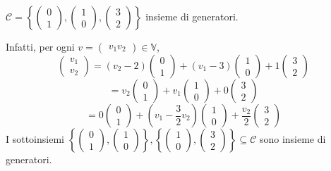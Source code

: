 \documentclass[12pt]{article}
\begin{document}
\begin{center}
$\mathcal{C} = \left\{\begin{pmatrix}
    0\\
    1
\end{pmatrix}, \begin{pmatrix}
    1\\
    0
\end{pmatrix}, \begin{pmatrix}
    3\\
    2
\end{pmatrix}\right\}$ insieme di generatori.
\end{center}
Infatti, per ogni $v = \begin{pmatrix}
    v_1
    v_2
\end{pmatrix} \in \mathbb{V}$,
\[\begin{pmatrix}
    v_1\\
    v_2
\end{pmatrix} = (v_2 - 2)\begin{pmatrix}
    0\\
    1
\end{pmatrix} + (v_1 - 3)\begin{pmatrix}
    1\\
    0
\end{pmatrix} + 1\begin{pmatrix}
    3\\
    2
\end{pmatrix}\]
\[= v_2\begin{pmatrix}
    0\\
    1
\end{pmatrix} + v_1\begin{pmatrix}
    1\\
    0
\end{pmatrix} + 0\begin{pmatrix}
    3\\
    2
\end{pmatrix}\]
\[= 0 \begin{pmatrix}
    0\\
    1
\end{pmatrix} + \left(v_1 - \frac{3}{2}v_2\right)\begin{pmatrix}
    1\\
    0
\end{pmatrix}+ \frac{v_2}{2}\begin{pmatrix}
    3\\
    2
\end{pmatrix}\]
I sottoinsiemi $\left\{ \begin{pmatrix}
    0\\
    1
\end{pmatrix}, \begin{pmatrix}
    1\\
    0
\end{pmatrix} \right\}, \left\{ \begin{pmatrix}
    1\\
    0
\end{pmatrix}, \begin{pmatrix}
    3\\
    2
\end{pmatrix}\right\} \subseteq \mathcal{C}$ sono insieme di generatori.
\end{document}
